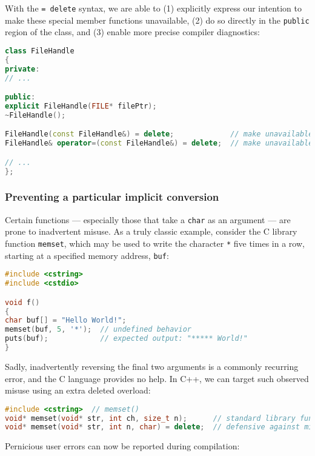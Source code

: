 \noindent With the \texttt{=}~\texttt{delete} syntax, we are able to (1)
explicitly express our intention to make these special member
functions unavailable, (2) do so directly in the \texttt{public} region
of the class, and (3) enable more precise compiler diagnostics:

\begin{lstlisting}[language=C++]
class FileHandle
{
private:
// ...

public:
explicit FileHandle(FILE* filePtr);
~FileHandle();

FileHandle(const FileHandle&) = delete;             // make unavailable
FileHandle& operator=(const FileHandle&) = delete;  // make unavailable

// ...
};
\end{lstlisting}


\subsubsection[Preventing a particular implicit conversion]{Preventing a particular implicit conversion}\label{preventing-a-particular-implicit-conversion}

Certain functions --- especially those that take a \texttt{char} as an
argument --- are prone to inadvertent misuse. As a truly classic
example, consider the C library function \texttt{memset}, which may be used
to write the character \texttt{*} five times in a row, starting at a
specified memory address, \texttt{buf}:

\begin{lstlisting}[language=C++]
#include <cstring>
#include <cstdio>

void f()
{
char buf[] = "Hello World!";
memset(buf, 5, '*');  // undefined behavior
puts(buf);            // expected output: "***** World!"
}
\end{lstlisting}

\noindent Sadly, inadvertently reversing the final two arguments is a commonly
recurring error, and the C language provides no help. In C++, we
can target such observed misuse using an extra deleted overload:

\begin{lstlisting}[language=C++]
#include <cstring>  // memset()
void* memset(void* str, int ch, size_t n);      // standard library function
void* memset(void* str, int n, char) = delete;  // defensive against misuse
\end{lstlisting}

\noindent Pernicious user errors can now be reported during compilation:

